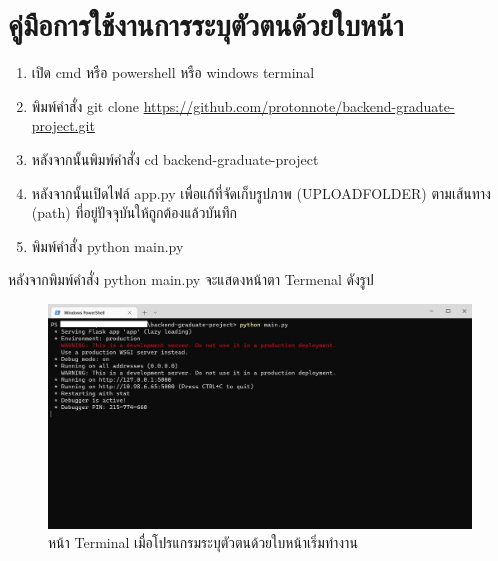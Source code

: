 \section{คู่มือการใช้งานการระบุตัวตนด้วยใบหน้า}
\begin{enumerate}
  \item เปิด cmd หรือ powershell หรือ windows terminal
  \item พิมพ์คำสั่ง git clone \url{https://github.com/protonnote/backend-graduate-project.git}
  \item หลังจากนั้นพิมพ์คำสั่ง cd backend-graduate-project
  \item หลังจากนั้นเปิดไฟล์ app.py เพื่อแก้ที่จัดเก็บรูปภาพ (UPLOAD\textunderscore FOLDER) ตามเส้นทาง (path) ที่อยู่ปัจจุบันให้ถูกต้องแล้วบันทึก
  \item พิมพ์คำสั่ง python main.py
\end{enumerate}

หลังจากพิมพ์คำสั่ง python main.py จะแสดงหน้าตา Termenal ดังรูป
\begin{figure}[!ht]
  \begin{center}
    \includegraphics[scale=.4]{pic/server_start.png}
    \caption[หน้า Terminal เมื่อโปรแกรมระบุตัวตนด้วยใบหน้าเริ่มทำงาน]{หน้า Terminal เมื่อโปรแกรมระบุตัวตนด้วยใบหน้าเริ่มทำงาน}
    \label{fig:server_start}
  \end{center}
\end{figure}